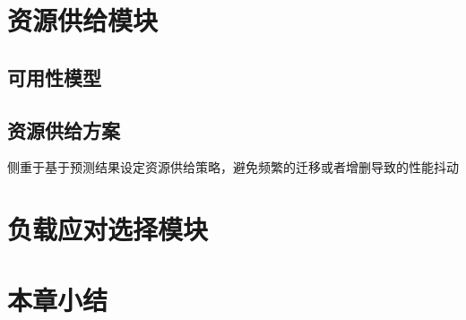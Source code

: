 \section{资源供给模块}
\subsection{可用性模型}

\subsection{资源供给方案}\label{sec:provision_design}
侧重于基于预测结果设定资源供给策略，避免频繁的迁移或者增删导致的性能抖动

\section{负载应对选择模块}\label{sec:node_selection}

\section{本章小结}
